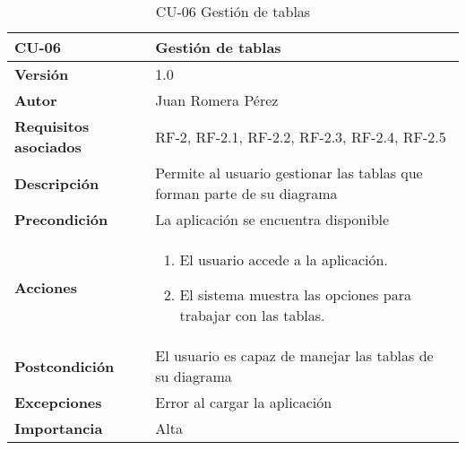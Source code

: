\begin{table}[p]
    \centering
    \begin{tabularx}{\linewidth}{ p{} p{}}
		\toprule
		\textbf{CU-06}    & \textbf{Gestión de tablas}\\
		\toprule
		\textbf{Versión}              & 1.0    \\
		\textbf{Autor}                & Juan Romera Pérez \\
		\textbf{Requisitos asociados} & RF-2, RF-2.1, RF-2.2, RF-2.3, RF-2.4, RF-2.5 \\
		\textbf{Descripción}          & Permite al usuario gestionar las tablas que forman parte de su diagrama \\
		\textbf{Precondición}         & La aplicación se encuentra disponible \\
		\textbf{Acciones}             &
		\begin{enumerate}
			\def\labelenumi{\arabic{enumi}.}
			\tightlist
			\item El usuario accede a la aplicación.
			\item El sistema muestra las opciones para trabajar con las tablas.
		\end{enumerate}\\
		\textbf{Postcondición}        & El usuario es capaz de manejar las tablas de su diagrama \\
		\textbf{Excepciones}          & Error al cargar la aplicación \\
		\textbf{Importancia}          & Alta \\
		\bottomrule
    \end{tabularx}
    \caption{CU-06 Gestión de tablas}
\end{table}

